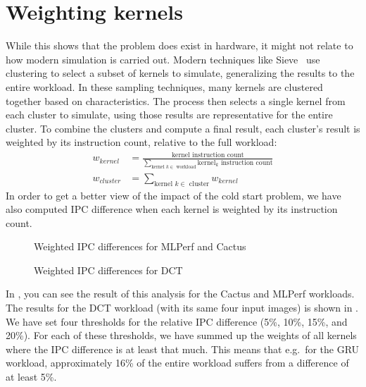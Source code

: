 \section{Weighting kernels}\label{sec:weighting-kernels}
While this shows that the problem does exist in hardware, it might not relate to how modern simulation is carried out.
Modern techniques like Sieve~\cite{sieve} use clustering to select a subset of kernels to simulate, generalizing the results to the entire workload.
In these sampling techniques, many kernels are clustered together based on characteristics.
The process then selects a single kernel from each cluster to simulate, using those results are representative for the entire cluster.
To combine the clusters and compute a final result, each cluster's result is weighted by its instruction count, relative to the full workload:
\begin{align*}
    w_{kernel} &= \frac{\text{kernel instruction count}}{\sum_{\text{kernel } k \in \text{ workload}}{\text{kernel}_k \text{ instruction count}}} \\
    w_{cluster} &= \sum_{\text{kernel } k \in \text{ cluster}} w_{kernel}
\end{align*}
In order to get a better view of the impact of the cold start problem, we have also computed IPC difference when each kernel is weighted by its instruction count.

\begin{figure}[ht]
    \centering
    \caption{Weighted IPC differences for MLPerf and Cactus}
    \label{fig:weight_ipc_diff}
\end{figure}
\begin{figure}[htb]
    \centering
    \caption{Weighted IPC differences for DCT}
    \label{fig:weight_ipc_dct}
\end{figure}

In , you can see the result of this analysis for the Cactus and MLPerf workloads.
The results for the DCT workload (with its same four input images) is shown in .
We have set four thresholds for the relative IPC difference (5\%, 10\%, 15\%, and 20\%).
For each of these thresholds, we have summed up the weights of all kernels where the IPC difference is at least that much.
This means that e.g.\ for the GRU workload, approximately 16\% of the entire workload suffers from a difference of at least 5\%.

